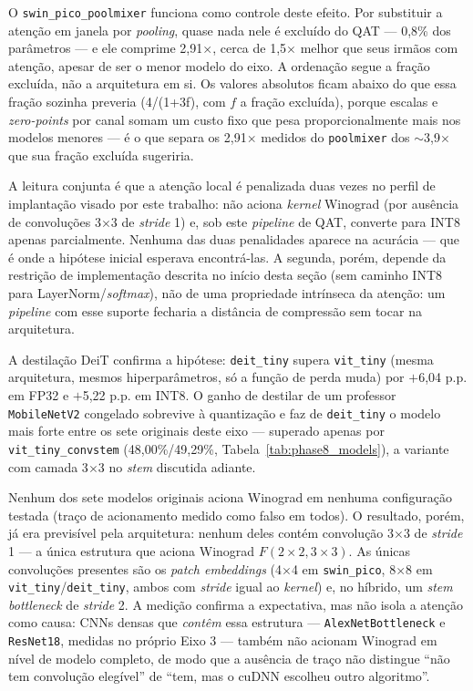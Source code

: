 \documentclass[conference]{IEEEtran}
\begin{document}
O \texttt{swin\_pico\_poolmixer} funciona como controle deste efeito. Por substituir a atenção em
janela por \textit{pooling}, quase nada nele é excluído do QAT --- 0,8\% dos
parâmetros --- e ele comprime 2,91$\times$, cerca de 1,5$\times$ melhor que seus irmãos com
atenção, apesar de ser o menor modelo do eixo. A ordenação segue a fração excluída, não a
arquitetura em si. Os valores absolutos ficam abaixo do que essa fração sozinha preveria
(4/(1+3f), com $f$ a fração excluída), porque escalas e \textit{zero-points} por canal somam um
custo fixo que pesa proporcionalmente mais nos modelos menores --- é o que separa os
2,91$\times$ medidos do \texttt{poolmixer} dos $\sim$3,9$\times$ que sua fração excluída sugeriria.

A leitura conjunta é que a atenção local é penalizada duas vezes no perfil de implantação
visado por este trabalho: não aciona \textit{kernel} Winograd (por ausência de convoluções
3$\times$3 de \textit{stride} 1) e, sob este \textit{pipeline} de QAT, converte para INT8 apenas
parcialmente. Nenhuma das duas penalidades aparece na acurácia --- que é onde a hipótese inicial
esperava encontrá-las. A segunda, porém, depende da restrição de implementação descrita no início
desta seção (sem caminho INT8 para LayerNorm/\textit{softmax}), não de uma propriedade intrínseca
da atenção: um \textit{pipeline} com esse suporte fecharia a distância de compressão sem tocar na
arquitetura.

A destilação DeiT confirma a hipótese: \texttt{deit\_tiny} supera
\texttt{vit\_tiny} (mesma arquitetura, mesmos hiperparâmetros, só a função de perda muda) por
$+$6,04 p.p. em FP32 e $+$5,22 p.p. em INT8. O ganho de destilar de um professor
\texttt{MobileNetV2} congelado sobrevive à quantização e faz de \texttt{deit\_tiny} o modelo mais
forte entre os sete originais deste eixo --- superado apenas por \texttt{vit\_tiny\_convstem}
(48,00\%/49,29\%, Tabela~\ref{tab:phase8_models}), a variante com camada 3$\times$3 no
\textit{stem} discutida adiante.

Nenhum dos sete modelos originais aciona Winograd em nenhuma configuração testada
(traço de acionamento medido como falso em todos). O resultado, porém, já era previsível pela
arquitetura: nenhum deles contém convolução 3$\times$3 de \textit{stride} 1 — a única
estrutura que aciona Winograd $F(2\times2,3\times3)$. As únicas convoluções presentes são os
\textit{patch embeddings} (4$\times$4 em \texttt{swin\_pico}, 8$\times$8 em
\texttt{vit\_tiny}/\texttt{deit\_tiny}, ambos com \textit{stride} igual ao \textit{kernel}) e, no
híbrido, um \textit{stem} \textit{bottleneck} de \textit{stride} 2. A medição confirma a
expectativa, mas não isola a atenção como causa: CNNs densas que \emph{contêm} essa estrutura —
\texttt{AlexNetBottleneck} e \texttt{ResNet18}, medidas no próprio Eixo 3 — também não acionam
Winograd em nível de modelo completo, de modo que a ausência de traço não distingue ``não tem
convolução elegível'' de ``tem, mas o cuDNN escolheu outro algoritmo''.
\end{document}
